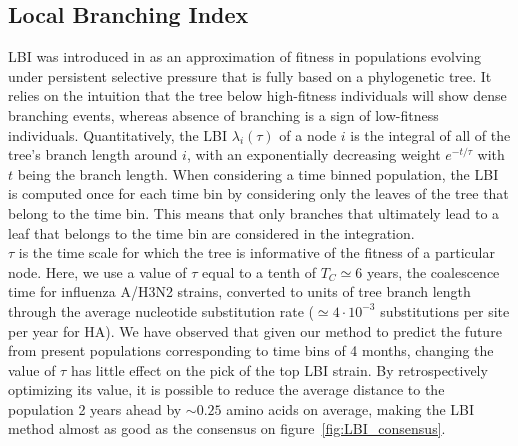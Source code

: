 \documentclass[reprint,amsmath,amssymb,superscriptaddress,showpacs,pre]{revtex4-1}
\begin{document}

\subsection*{Local Branching Index} %
\label{sub:local_branching_index}
		
	LBI was introduced in \cite{neher_predicting_2014} as an approximation of fitness in populations evolving under persistent selective pressure that is fully based on a phylogenetic tree. It relies on the intuition that the tree below high-fitness individuals will show dense branching events, whereas absence of branching is a sign of low-fitness individuals. Quantitatively, the LBI $\lambda_i(\tau)$ of a node $i$ is the integral of all of the tree's branch length around $i$, with an exponentially decreasing weight $e^{-t/\tau}$ with $t$ being the branch length. When considering a time binned population, the LBI is computed once for each time bin by considering only the leaves of the tree that belong to the time bin. This means that only branches that ultimately lead to a leaf that belongs to the time bin are considered in the integration.\\ 
	$\tau$ is the time scale for which the tree is informative of the fitness of a particular node. Here, we use a value of $\tau$ equal to a tenth of $T_C\simeq6$ years, the coalescence time for influenza A/H3N2 strains, converted to units of tree branch length through the average nucleotide substitution rate ($\simeq 4\cdot 10^{-3}$ substitutions per site per year for HA). We have observed that given our method to predict the future from present populations corresponding to time bins of 4 months, changing the value of $\tau$ has little effect on the pick of the top LBI strain. By retrospectively optimizing its value, it is possible to reduce the average distance to the population 2 years ahead by $\sim0.25$ amino acids on average, making the LBI method almost as good as the consensus on figure~\ref{fig:LBI_consensus}. 

\end{document}
